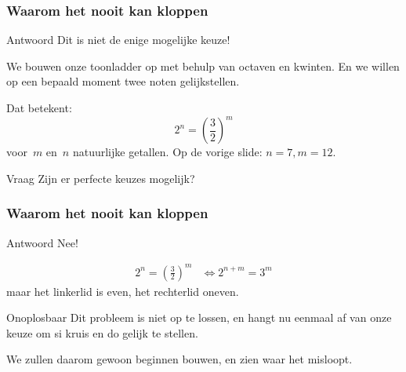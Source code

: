 \documentclass[compress, darktitle, framenumber, handout, totalframenumber]{beamer}
\begin{document}
\begin{frame}
  \frametitle{Waarom het nooit kan kloppen}

  \begin{block}{Antwoord}
    Dit is niet de enige mogelijke keuze!
  \end{block}
  We bouwen onze toonladder op met behulp van octaven en kwinten. En we willen op een bepaald moment twee noten gelijkstellen.

  \pause
  Dat betekent:
  \begin{equation}
    2^n=\left( \frac{3}{2} \right)^m
  \end{equation}
  voor~$m$ en~$n$ natuurlijke getallen. Op de vorige slide: $n=7,m=12$.
  \pause
  \begin{alertblock}{Vraag}
    Zijn er perfecte keuzes mogelijk?
  \end{alertblock}
\end{frame}

\begin{frame}
  \frametitle{Waarom het nooit kan kloppen}

  \begin{block}{Antwoord}
    Nee!
  \end{block}
  \pause
  \begin{equation}
    \begin{aligned}
      2^n=\left( \frac{3}{2} \right)^m&\Longleftrightarrow 2^{n+m}=3^m
    \end{aligned}
  \end{equation}
  maar het linkerlid is even, het rechterlid oneven.
  \pause
  \begin{block}{Onoplosbaar}
    Dit probleem is niet op te lossen, en hangt nu eenmaal af van onze keuze om si kruis en do gelijk te stellen.
  \end{block}
  We zullen daarom gewoon beginnen bouwen, en zien waar het misloopt.
\end{frame}
\end{document}
